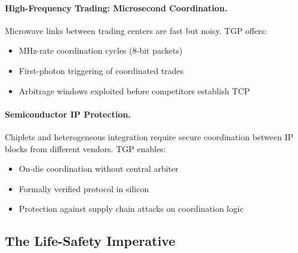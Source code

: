 \paragraph{High-Frequency Trading: Microsecond Coordination.}
Microwave links between trading centers are fast but noisy. TGP offers:
\begin{itemize}
    \item MHz-rate coordination cycles (8-bit packets)
    \item First-photon triggering of coordinated trades
    \item Arbitrage windows exploited before competitors establish TCP
\end{itemize}

\paragraph{Semiconductor IP Protection.}
Chiplets and heterogeneous integration require secure coordination between IP blocks from different vendors. TGP enables:
\begin{itemize}
    \item On-die coordination without central arbiter
    \item Formally verified protocol in silicon
    \item Protection against supply chain attacks on coordination logic
\end{itemize}

\subsection{The Life-Safety Imperative}

\begin{center}
\end{center}

